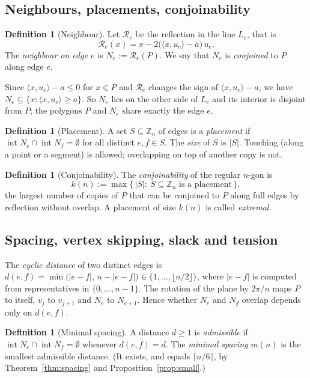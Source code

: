 \documentclass[11pt,a4paper]{article}
\theoremstyle{definition}
\newtheorem{definition}[theorem]{Definition}
\theoremstyle{remark}
\newcommand{\Z}{\mathbb{Z}}
\newcommand{\inter}{\operatorname{int}}
\newcommand{\ip}[2]{\langle #1,#2\rangle}
\newcommand{\Rf}{\mathcal{R}}
\begin{document}
\subsection{Neighbours, placements, conjoinability}

\begin{definition}[Neighbour]\label{def:neighbour}
Let $\Rf_e$ be the reflection in the line $L_e$, that is
\[
\Rf_e(x)=x-2\big(\ip{x}{u_e}-a\big)\,u_e .
\]
The \emph{neighbour on edge $e$} is $N_e:=\Rf_e(P)$. We say that $N_e$ is \emph{conjoined} to $P$ along edge $e$.
\end{definition}

Since $\ip{x}{u_e}-a\le0$ for $x\in P$ and $\Rf_e$ changes the sign of $\ip{x}{u_e}-a$, we have $N_e\subseteq\{x:\ip{x}{u_e}\ge a\}$. So $N_e$ lies on the other side of $L_e$ and its interior is disjoint from $P$; the polygons $P$ and $N_e$ share exactly the edge $e$.

\begin{definition}[Placement]\label{def:placement}
A set $S\subseteq\Z_n$ of edges is a \emph{placement} if $\inter N_e\cap\inter N_f=\emptyset$ for all distinct $e,f\in S$. The \emph{size} of $S$ is $|S|$.
Touching (along a point or a segment) is allowed; overlapping on top of another copy is not.
\end{definition}

\begin{definition}[Conjoinability]\label{def:conj}
The \emph{conjoinability} of the regular $n$-gon is
\[
k(n):=\max\{\,|S|:\ S\subseteq\Z_n\text{ is a placement}\,\},
\]
the largest number of copies of $P$ that can be conjoined to $P$ along full edges by reflection without overlap.
A placement of size $k(n)$ is called \emph{extremal}.
\end{definition}

\subsection{Spacing, vertex skipping, slack and tension}

The \emph{cyclic distance} of two distinct edges is $d(e,f)=\min\big(|e-f|,\,n-|e-f|\big)\in\{1,\dots,\lfloor n/2\rfloor\}$, where $|e-f|$ is computed from representatives in $\{0,\dots,n-1\}$.
The rotation of the plane by $2\pi/n$ maps $P$ to itself, $v_j$ to $v_{j+1}$ and $N_e$ to $N_{e+1}$. Hence whether $N_e$ and $N_f$ overlap depends only on $d(e,f)$.

\begin{definition}[Minimal spacing]\label{def:spacing}
A distance $d\ge1$ is \emph{admissible} if $\inter N_e\cap\inter N_f=\emptyset$ whenever $d(e,f)=d$. The \emph{minimal spacing} $m(n)$ is the smallest admissible distance.
(It exists, and equals $\lceil n/6\rceil$, by Theorem~\ref{thm:spacing} and Proposition~\ref{prop:small}.)
\end{definition}
\end{document}
